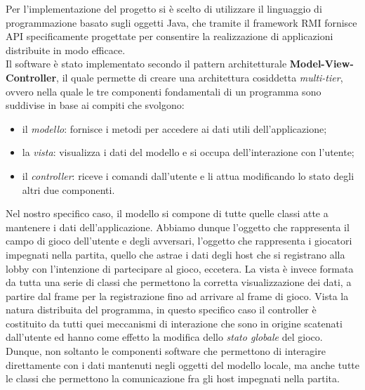 Per l'implementazione del progetto si è scelto di utilizzare il linguaggio 
di programmazione basato sugli oggetti Java, che tramite il framework RMI 
fornisce API specificamente progettate per consentire la realizzazione di 
applicazioni distribuite in modo efficace.
\\
Il software è stato implementato secondo il pattern architetturale \textbf{Model-View-Controller}, il quale permette di creare una
architettura cosiddetta \textit{multi-tier}, ovvero nella quale le tre
componenti fondamentali di un programma sono suddivise in base ai compiti che
svolgono:
\begin{itemize}
	\item il \textit{modello}: fornisce i metodi per accedere ai dati utili
	dell'applicazione;
	\item la \textit{vista}: visualizza i dati del modello e si 
occupa
	dell'interazione con l'utente;
	\item il \textit{controller}: riceve i comandi dall'utente e li attua
	modificando lo stato degli altri due componenti.
\end{itemize}
Nel nostro specifico caso, il modello si compone di tutte quelle classi atte a
mantenere i dati dell'applicazione. Abbiamo dunque l'oggetto che rappresenta il
campo di gioco dell'utente e degli avversari, l'oggetto che rappresenta i
giocatori impegnati nella partita, quello che astrae i dati degli host che si
registrano alla lobby con l'intenzione di partecipare al gioco,
eccetera.\newline
La vista è invece formata da tutta una serie di classi che permettono la
corretta visualizzazione dei dati, a partire dal frame per la registrazione fino
ad arrivare al frame di gioco.\newline
Vista la natura distribuita del programma, in questo specifico caso il
controller è costituito da tutti quei meccanismi di interazione che
sono in origine scatenati dall'utente ed hanno come effetto la modifica dello
\textit{stato globale} del gioco. Dunque, non soltanto le componenti software
che permettono di interagire direttamente con i dati mantenuti negli oggetti
del modello locale, ma anche tutte le classi che permettono la
comunicazione fra gli host impegnati nella partita.\newline